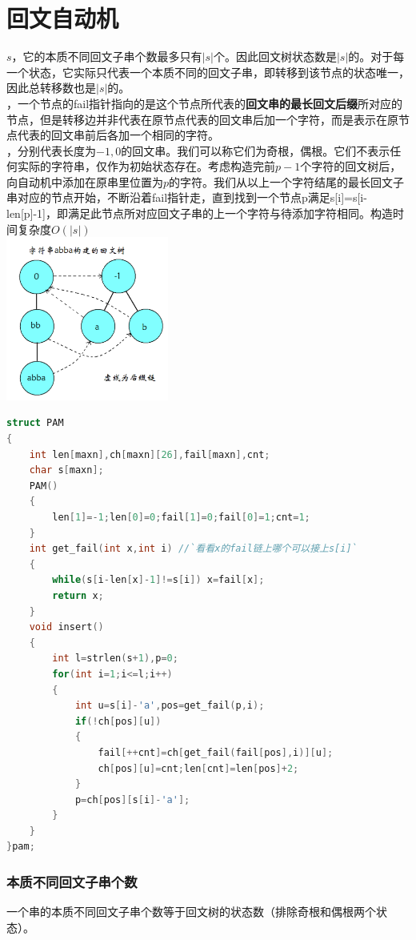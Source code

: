 \documentclass[a4paper]{book}
\begin{document}
\section{回文自动机}
$s$，它的本质不同回文子串个数最多只有$|s|$个。因此回文树状态数是$|s|$的。对于每一个状态，它实际只代表一个本质不同的回文子串，即转移到该节点的状态唯一，因此总转移数也是$|s|$的。\\
，一个节点的fail指针指向的是这个节点所代表的\textbf{回文串的最长回文后缀}所对应的节点，但是转移边并非代表在原节点代表的回文串后加一个字符，而是表示在原节点代表的回文串前后各加一个相同的字符。\\
，分别代表长度为$-1,0$的回文串。我们可以称它们为奇根，偶根。它们不表示任何实际的字符串，仅作为初始状态存在。考虑构造完前$p-1$个字符的回文树后，向自动机中添加在原串里位置为$p$的字符。我们从以上一个字符结尾的最长回文子串对应的节点开始，不断沿着fail指针走，直到找到一个节点p满足s[i]=s[i-len[p]-1]，即满足此节点所对应回文子串的上一个字符与待添加字符相同。构造时间复杂度$O(|s|)$\\
\includegraphics[width=0.4\textwidth,center]{../photo/pam}\\
\begin{lstlisting}[language=c++,escapeinside=``]
struct PAM
{
    int len[maxn],ch[maxn][26],fail[maxn],cnt;
    char s[maxn];
    PAM()
    {
        len[1]=-1;len[0]=0;fail[1]=0;fail[0]=1;cnt=1;
    }
    int get_fail(int x,int i) //`看看x的fail链上哪个可以接上s[i]`
    {
        while(s[i-len[x]-1]!=s[i]) x=fail[x];
        return x;
    }
    void insert()
    {
        int l=strlen(s+1),p=0;
        for(int i=1;i<=l;i++)
        {
            int u=s[i]-'a',pos=get_fail(p,i);
            if(!ch[pos][u])
            {
                fail[++cnt]=ch[get_fail(fail[pos],i)][u];
                ch[pos][u]=cnt;len[cnt]=len[pos]+2;
            }
            p=ch[pos][s[i]-'a'];
        }
    }
}pam;
\end{lstlisting}
\subsubsection{本质不同回文子串个数}
一个串的本质不同回文子串个数等于回文树的状态数（排除奇根和偶根两个状态）。
\end{document}

